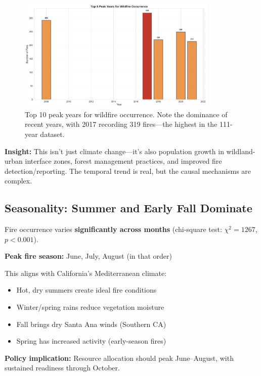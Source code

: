 \documentclass[11pt,a4paper]{article}
\begin{document}
\begin{figure}[h]
\centering
\includegraphics[width=0.85\textwidth]{peak_years_for_fires.png}
\caption{Top 10 peak years for wildfire occurrence. Note the dominance of recent years, with 2017 recording 319 fires---the highest in the 111-year dataset.}
\label{fig:peakyears}
\end{figure}

\begin{tcolorbox}[colback=warningcolor!10!white, colframe=warningcolor]
\textbf{Insight:} This isn't just climate change---it's also population growth in wildland-urban interface zones, forest management practices, and improved fire detection/reporting. The temporal trend is real, but the causal mechanisms are complex.
\end{tcolorbox}

\subsection{Seasonality: Summer and Early Fall Dominate}

Fire occurrence varies \textbf{significantly across months} (chi-square test: $\chi^2 = 1267$, $p < 0.001$).

\textbf{Peak fire season:} June, July, August (in that order)

This aligns with California's Mediterranean climate:
\begin{itemize}
    \item Hot, dry summers create ideal fire conditions
    \item Winter/spring rains reduce vegetation moisture
    \item Fall brings dry Santa Ana winds (Southern CA)
    \item Spring has increased activity (early-season fires)
\end{itemize}

\textbf{Policy implication:} Resource allocation should peak June--August, with sustained readiness through October.
\end{document}
